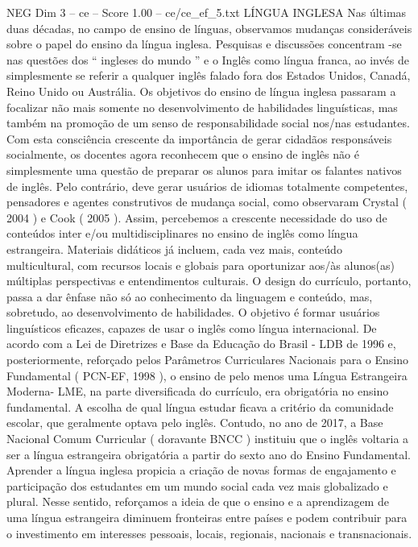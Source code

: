 \begin{textsample}{NEG Dim 3 – ce – Score 1.00 – ce/ce\_ef\_5.txt}  \label{ex:f3_neg_239}
LÍNGUA INGLESA Nas últimas duas décadas, no campo de ensino de línguas, observamos mudanças consideráveis sobre o papel do ensino da língua inglesa.
Pesquisas e discussões concentram -se nas questões dos “ ingleses do mundo ” e o Inglês como língua franca, ao invés de simplesmente se referir a qualquer inglês falado fora dos Estados Unidos, Canadá, Reino Unido ou Austrália.
Os objetivos do ensino de língua inglesa passaram a focalizar não mais somente no desenvolvimento de habilidades linguísticas, mas também na promoção de um senso de responsabilidade social nos/nas estudantes.
Com esta consciência crescente da importância de gerar cidadãos responsáveis socialmente, os docentes agora reconhecem que o ensino de inglês não é simplesmente uma questão de preparar os alunos para imitar os falantes nativos de inglês.
Pelo contrário, deve gerar usuários de idiomas totalmente competentes, pensadores e agentes construtivos de mudança social, como observaram Crystal ( 2004 ) e Cook ( 2005 ).
Assim, percebemos a crescente necessidade do uso de conteúdos inter e/ou multidisciplinares no ensino de inglês como língua estrangeira.
Materiais didáticos já incluem, cada vez mais, conteúdo multicultural, com recursos locais e globais para oportunizar aos/às alunos(as) múltiplas perspectivas e entendimentos culturais.
O design do currículo, portanto, passa a dar ênfase não só ao conhecimento da linguagem e conteúdo, mas, sobretudo, ao desenvolvimento de habilidades.
O objetivo é formar usuários linguísticos eficazes, capazes de usar o inglês como língua internacional.
De acordo com a Lei de Diretrizes e Base da Educação do Brasil - LDB de 1996 e, posteriormente, reforçado pelos Parâmetros Curriculares Nacionais para o Ensino Fundamental ( PCN-EF, 1998 ), o ensino de pelo menos uma Língua Estrangeira Moderna- LME, na parte diversificada do currículo, era obrigatória no ensino fundamental.
A escolha de qual língua estudar ficava a critério da comunidade escolar, que geralmente optava pelo inglês.
Contudo, no ano de 2017, a Base Nacional Comum Curricular ( doravante BNCC ) instituiu que o inglês voltaria a ser a língua estrangeira obrigatória a partir do sexto ano do Ensino Fundamental.
Aprender a língua inglesa propicia a criação de novas formas de engajamento e participação dos estudantes em um mundo social cada vez mais globalizado e plural.
Nesse sentido, reforçamos a ideia de que o ensino e a aprendizagem de uma língua estrangeira diminuem fronteiras entre países e podem contribuir para o investimento em interesses pessoais, locais, regionais, nacionais e transnacionais.

\end{textsample}
